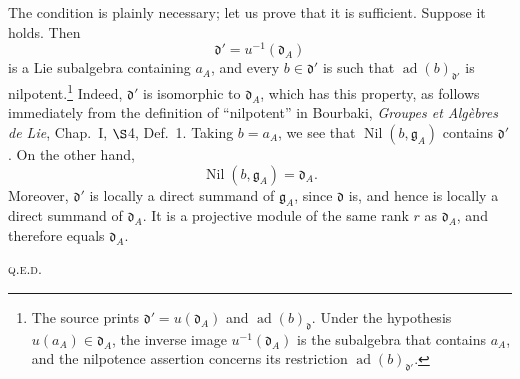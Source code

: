 The condition is plainly necessary; let us prove that it is
sufficient. Suppose it holds. Then
\[
  \mathfrak d'=u^{-1}(\mathfrak d_A)
\]
is a Lie subalgebra containing \(a_A\), and every \(b\in\mathfrak d'\)
is such that \(\operatorname{ad}(b)_{\mathfrak d'}\) is
nilpotent.\footnote{The source prints
\(\mathfrak d'=u(\mathfrak d_A)\) and
\(\operatorname{ad}(b)_{\mathfrak d}\). Under the hypothesis
\(u(a_A)\in\mathfrak d_A\), the inverse image
\(u^{-1}(\mathfrak d_A)\) is the subalgebra that contains \(a_A\),
and the nilpotence assertion concerns its restriction
\(\operatorname{ad}(b)_{\mathfrak d'}\).}
Indeed, \(\mathfrak d'\) is isomorphic to \(\mathfrak d_A\), which
has this property, as follows immediately from the definition of
``nilpotent'' in Bourbaki, \emph{Groupes et Algèbres de Lie},
Chap.~I, \(\S\)4, Def.~1. Taking \(b=a_A\), we see that
\(\operatorname{Nil}(b,\mathfrak g_A)\) contains \(\mathfrak d'\).
On the other hand,
\[
  \operatorname{Nil}(b,\mathfrak g_A)=\mathfrak d_A.
\]
Moreover, \(\mathfrak d'\) is locally a direct summand of
\(\mathfrak g_A\), since \(\mathfrak d\) is, and hence is locally a
direct summand of \(\mathfrak d_A\). It is a projective module of the
same rank \(r\) as \(\mathfrak d_A\), and therefore equals
\(\mathfrak d_A\).
\par\hfill\textsc{q.e.d.}

